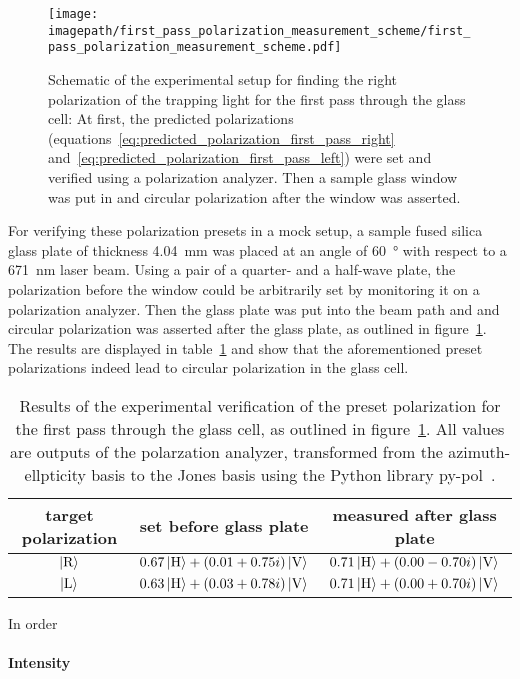 \begin{figure}
    \centering
    \texttt{[image: \\imagepath/first\_pass\_polarization\_measurement\_scheme/first\_pass\_polarization\_measurement\_scheme.pdf]}
    \caption{Schematic of the experimental setup for finding the right polarization of the trapping light for the first pass through the glass cell: At first, the predicted polarizations (equations~\eqref{eq:predicted_polarization_first_pass_right} and~\eqref{eq:predicted_polarization_first_pass_left}) were set and verified using a polarization analyzer. Then a sample glass window was put in and circular polarization after the window was asserted.}
    \label{fig:first_pass_polarization_measurement_scheme}
\end{figure}

For verifying these polarization presets in a mock setup, a sample fused silica glass plate of thickness \SI{4.04}{\milli\meter} was placed at an angle of \SI{60}{\degree} with respect to a \SI{671}{\nano\meter} laser beam. Using a pair of a quarter- and a half-wave plate, the polarization before the window could be arbitrarily set by monitoring it on a polarization analyzer. Then the glass plate was put into the beam path and and circular polarization was asserted after the glass plate, as outlined in figure~\ref{fig:first_pass_polarization_measurement_scheme}. The results are displayed in table~\ref{tab:polarization_first_pass} and show that the aforementioned preset polarizations indeed lead to circular polarization in the glass cell.

\begin{table}
    \begin{tabularx}{\textwidth}{ccc}
        \toprule
        target polarization & set before glass plate & measured after glass plate \\
        \midrule
        $\Ket{\text{R}}$ & $0.67 \Ket{\text{H}} + (0.01 + 0.75i) \Ket{\text{V}}$ & $0.71 \Ket{\text{H}} + (0.00 - 0.70i)\Ket{\text{V}}$ \\
        $\Ket{\text{L}}$ & $0.63 \Ket{\text{H}} + (0.03 + 0.78i) \Ket{\text{V}}$ & $0.71 \Ket{\text{H}} + (0.00 + 0.70i) \Ket{\text{V}}$ \\
        \bottomrule
    \end{tabularx}
    \caption{Results of the experimental verification of the preset polarization for the first pass through the glass cell, as outlined in figure~\ref{fig:first_pass_polarization_measurement_scheme}. All values are outputs of the polarzation analyzer, transformed from the azimuth-ellpticity basis to the Jones basis using the Python library py-pol~\cite{noauthor_python_nodate}.}
    \label{tab:polarization_first_pass}
\end{table}

In order


\paragraph{Intensity}
